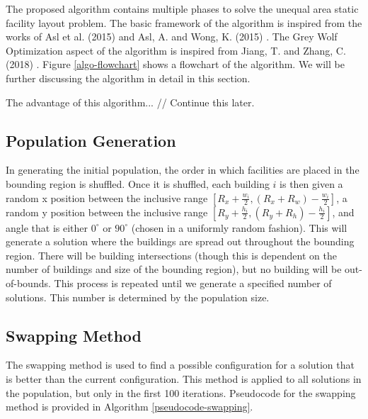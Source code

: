The proposed algorithm contains multiple phases to solve the unequal area static facility layout problem. The basic framework of the algorithm is inspired from the works of Asl et al. (2015) \cite{Asl2015} and Asl, A. and Wong, K. (2015) \cite{Asl2015}. The Grey Wolf Optimization aspect of the algorithm is inspired from Jiang, T. and Zhang, C. (2018) \cite{Jiang2018}. Figure \ref{algo-flowchart} shows a flowchart of the algorithm. We will be further discussing the algorithm in detail in this section.

The advantage of this algorithm... // Continue this later.

\subsection{Population Generation}
In generating the initial population, the order in which facilities are placed in the bounding region is shuffled. Once it is shuffled, each building $i$ is then given a random x position between the inclusive range $\left [ R_{x} + \frac{w_{i}}{2}, (R_{x} + R_{w}) - \frac{w_{i}}{2} \right ]$, a random y position between the inclusive range $\left [ R_{y} + \frac{h_{i}}{2}, (R_{y} + R_{h})  - \frac{h_{i}}{2} \right ]$, and angle that is either $0^{\circ}$ or $90^{\circ}$ (chosen in a uniformly random fashion). This will generate a solution where the buildings are spread out throughout the bounding region. There will be building intersections (though this is dependent on the number of buildings and size of the bounding region), but no building will be out-of-bounds. This process is repeated until we generate a specified number of solutions. This number is determined by the population size.

\subsection{Swapping Method}
The swapping method is used to find a possible configuration for a solution that is better than the current configuration. This method is applied to all solutions in the population, but only in the first 100 iterations. Pseudocode for the swapping method is provided in Algorithm \ref{pseudocode-swapping}.

